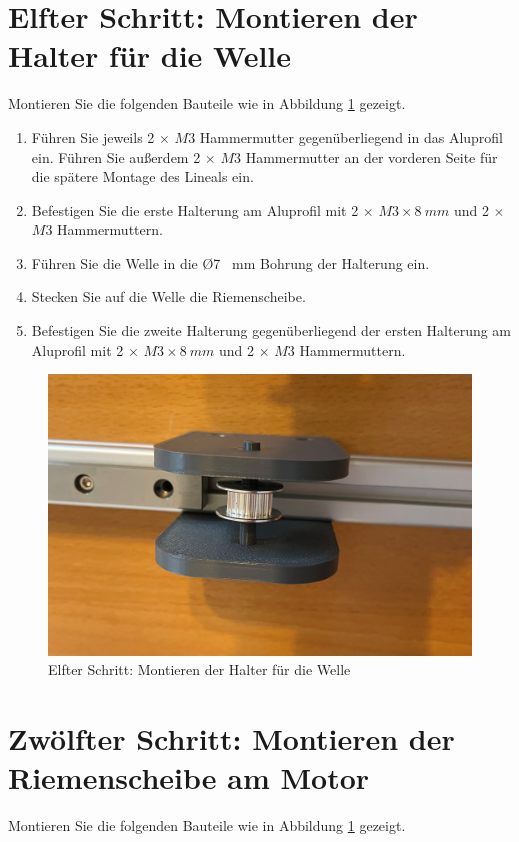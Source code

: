 \section{Elfter Schritt: Montieren der Halter für die Welle}
Montieren Sie die folgenden Bauteile wie in Abbildung \ref{11.S} gezeigt.

\begin{enumerate}
	\item Führen Sie jeweils 2 $\times$ $ M3 $ Hammermutter gegenüberliegend in das Aluprofil ein. Führen Sie außerdem 2 $\times$ $ M3 $ Hammermutter an der vorderen Seite für die spätere Montage des Lineals ein. 
	\item Befestigen Sie die erste Halterung am Aluprofil mit 2 $\times$ $ M3 \times 8 \ mm $ und 2 $\times$ $ M3 $ Hammermuttern.
	\item Führen Sie die Welle in die \O 7 \ mm Bohrung der Halterung ein.
	\item Stecken Sie auf die Welle die Riemenscheibe.
	\item Befestigen Sie die zweite Halterung gegenüberliegend der ersten Halterung am Aluprofil mit 2 $\times$ $ M3 \times 8 \ mm $ und 2 $\times$ $ M3 $ Hammermuttern.
\end{enumerate}

\begin{figure}[H]
	\begin{center}
		\includegraphics[width=\textwidth]{Images/11Schr.jpg}
		\caption{Elfter Schritt: Montieren der Halter für die Welle} \label{11.S}
	\end{center}
\end{figure}


\section{Zwölfter Schritt: Montieren der Riemenscheibe am Motor}
Montieren Sie die folgenden Bauteile wie in Abbildung \ref{11.S} gezeigt.

